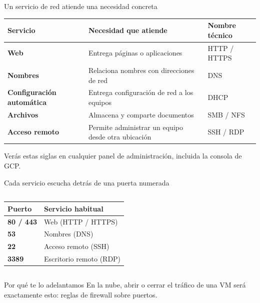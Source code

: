 \documentclass[aspectratio=169,10pt,c]{beamer}
\begin{document}
\begin{frame}{Un servicio de red atiende una necesidad concreta}
\begin{center}
\small
\begin{tabular}{>{\bfseries}p{2.8cm}p{5.0cm}p{3.4cm}}
\toprule
Servicio & Necesidad que atiende & Nombre técnico \\
\midrule
Web & Entrega páginas o aplicaciones & HTTP / HTTPS \\
Nombres & Relaciona nombres con direcciones de red & DNS \\
Configuración automática & Entrega configuración de red a los equipos & DHCP \\
Archivos & Almacena y comparte documentos & SMB / NFS \\
Acceso remoto & Permite administrar un equipo desde otra ubicación & SSH / RDP \\
\bottomrule
\end{tabular}
\end{center}
\vspace{0.1cm}
\small Verás estas siglas en cualquier panel de administración, incluida la consola de GCP.
\end{frame}

\begin{frame}{Cada servicio escucha detrás de una puerta numerada\apoyo}
\begin{columns}[T,onlytextwidth]
\begin{center}
\small
\begin{tabular}{>{\bfseries}p{1.6cm}p{3.6cm}}
\toprule
Puerto & Servicio habitual \\
\midrule
80 / 443 & Web (HTTP / HTTPS) \\
53 & Nombres (DNS) \\
22 & Acceso remoto (SSH) \\
3389 & Escritorio remoto (RDP) \\
\bottomrule
\end{tabular}
\end{center}
\end{columns}
\vspace{0.1cm}
\begin{block}{Por qué te lo adelantamos}
\small En la nube, abrir o cerrar el tráfico de una VM será exactamente esto: reglas de firewall sobre puertos.
\end{block}
\end{frame}
\end{document}
